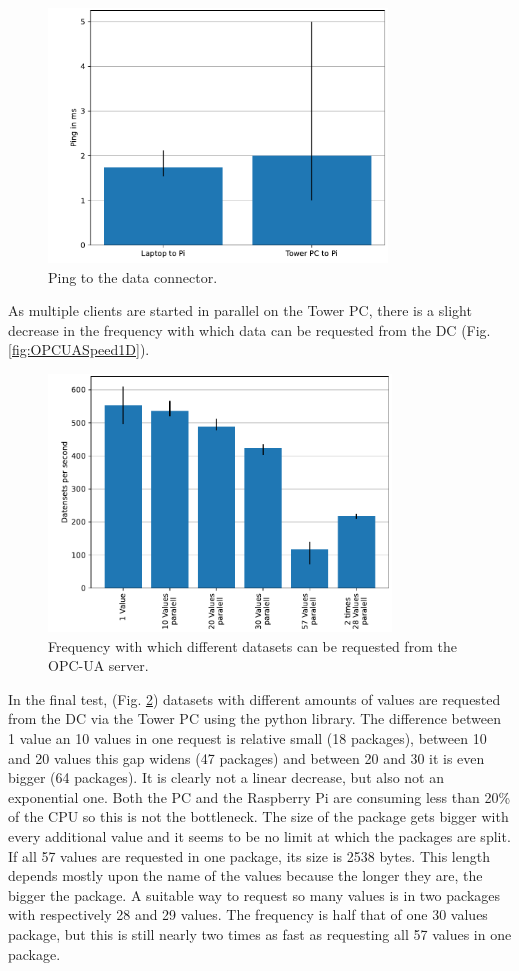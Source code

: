 \documentclass[conference]{IEEEtran}
\begin{document}
\begin{figure}[htbp]
    \centerline{\includegraphics[width=9cm]{Pictures/PingDiagram.pdf}}
    \caption{Ping to the data connector.}
    \label{fig:PingDiagram}
\end{figure}
As multiple clients are started in parallel on the Tower PC, there is a slight decrease in the frequency with which  data can be requested from the DC (Fig. \ref{fig:OPCUASpeed1D}).\\
\begin{figure}[b]
    \centerline{\includegraphics[width=9.1cm]{Pictures/OPCUAMultipleDatenAufEinmal.pdf}}
    \caption{Frequency with which different datasets can be requested from the OPC-UA server.}
    \label{fig:OPCUAMultipleDatenAufEinmal}
\end{figure}
In the final test, (Fig. \ref{fig:OPCUAMultipleDatenAufEinmal}) datasets with different amounts of values are requested from the DC via the Tower PC using the python library.
The difference between 1 value an 10 values in one request is relative small (18 packages), between 10 and 20 values this gap widens (47 packages) and between 20 and 30 it is even bigger (64 packages).
It is clearly not a linear decrease, but also not an exponential one. 
Both the PC and the Raspberry Pi are consuming less than 20\% of the CPU so this is not the bottleneck.
The size of the package gets bigger with every additional value and it seems to be no limit at which the packages are split.
If all 57 values are requested in one package, its size is 2538 bytes.
This length depends mostly upon the name of the values because the longer they are, the bigger the package.
A suitable way to request so many values is in two packages with respectively 28 and 29 values. The frequency is half that of one 30 values package, but this is still nearly two times as fast as requesting all 57 values in one package.
\end{document}

